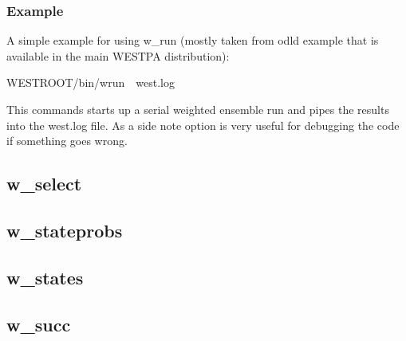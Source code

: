 \documentclass[letterpaper,10pt,english]{sphinxmanual}
\begin{document}
\subsubsection{Example}
\label{\detokenize{users_guide/command_line_tools/w_run:example}}
A simple example for using w\_run (mostly taken from odld example that
is available in the main WESTPA distribution):

\begin{sphinxVerbatim}[commandchars=\\\{\}]
\PYGZdl{}WEST\PYGZus{}ROOT/bin/w\PYGZus{}run \PYGZam{}\PYGZgt{} west.log
\end{sphinxVerbatim}

This commands starts up a serial weighted ensemble run and pipes the results
into the west.log file. As a side note  option is very useful for
debugging the code if something goes wrong.


\subsection{w\_select}
\label{\detokenize{users_guide/command_line_tools/w_select:w-select}}\label{\detokenize{users_guide/command_line_tools/w_select:id1}}\label{\detokenize{users_guide/command_line_tools/w_select::doc}}

\subsection{w\_stateprobs}
\label{\detokenize{users_guide/command_line_tools/w_stateprobs:w-stateprobs}}\label{\detokenize{users_guide/command_line_tools/w_stateprobs:id1}}\label{\detokenize{users_guide/command_line_tools/w_stateprobs::doc}}

\subsection{w\_states}
\label{\detokenize{users_guide/command_line_tools/w_states:w-states}}\label{\detokenize{users_guide/command_line_tools/w_states:id1}}\label{\detokenize{users_guide/command_line_tools/w_states::doc}}

\subsection{w\_succ}
\label{\detokenize{users_guide/command_line_tools/w_succ:w-succ}}\label{\detokenize{users_guide/command_line_tools/w_succ:id1}}\label{\detokenize{users_guide/command_line_tools/w_succ::doc}}
\end{document}
